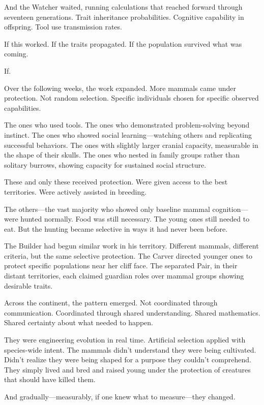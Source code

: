 And the Watcher waited, running calculations that reached forward through seventeen generations. Trait inheritance probabilities. Cognitive capability in offspring. Tool use transmission rates.

If this worked. If the traits propagated. If the population survived what was coming.

If.

\scenebreak

Over the following weeks, the work expanded. More mammals came under protection. Not random selection. Specific individuals chosen for specific observed capabilities.

The ones who used tools. The ones who demonstrated problem-solving beyond instinct. The ones who showed social learning—watching others and replicating successful behaviors. The ones with slightly larger cranial capacity, measurable in the shape of their skulls. The ones who nested in family groups rather than solitary burrows, showing capacity for sustained social structure.

These and only these received protection. Were given access to the best territories. Were actively assisted in breeding.

The others—the vast majority who showed only baseline mammal cognition—were hunted normally. Food was still necessary. The young ones still needed to eat. But the hunting became selective in ways it had never been before.

The Builder had begun similar work in his territory. Different mammals, different criteria, but the same selective protection. The Carver directed younger ones to protect specific populations near her cliff face. The separated Pair, in their distant territories, each claimed guardian roles over mammal groups showing desirable traits.

Across the continent, the pattern emerged. Not coordinated through communication. Coordinated through shared understanding. Shared mathematics. Shared certainty about what needed to happen.

They were engineering evolution in real time. Artificial selection applied with species-wide intent. The mammals didn't understand they were being cultivated. Didn't realize they were being shaped for a purpose they couldn't comprehend. They simply lived and bred and raised young under the protection of creatures that should have killed them.

And gradually—measurably, if one knew what to measure—they changed.

